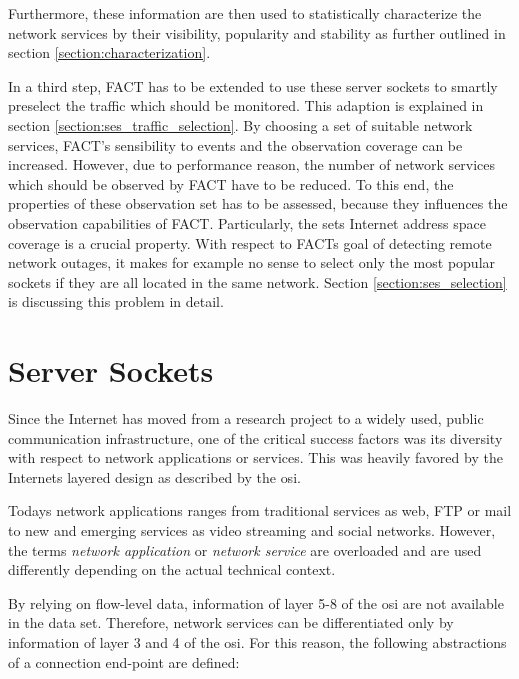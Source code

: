 Furthermore, these information are then used to statistically characterize the network services by their visibility, popularity and stability as further outlined in section \ref{section:characterization}.

In a third step, FACT has to be extended to use these server sockets to smartly preselect the traffic which should be monitored. 
This adaption is explained in section \ref{section:ses_traffic_selection}. 
By choosing a set of suitable network services, \gls{FACT}'s sensibility to events and the observation coverage can be increased. 
However, due to performance reason, the number of network services which should be observed by \gls{FACT} have to be reduced. 
To this end, the properties of these observation set has to be assessed, because they influences the observation capabilities of \gls{FACT}. 
Particularly, the sets Internet address space coverage is a crucial property. 
With respect to FACTs goal of detecting remote network outages, it makes for example no sense to select only the most popular sockets if they are all located in the same network. 
Section \ref{section:ses_selection} is discussing this problem in detail. 

\section{Server Sockets}
Since the Internet has moved from a research project to a widely used, public communication infrastructure, one of the critical success factors was its diversity with respect to network applications or services. This was heavily favored by the Internets layered design as described by the \gls{osi}.

Todays network applications ranges from traditional services as web, \gls{FTP} or mail to new and emerging services as video streaming and social networks. However, the terms \emph{network application} or \emph{network service} are overloaded and are used differently depending on the actual technical context.

By relying on flow-level data, information of layer 5-8 of the \gls{osi} are not available in the data set. Therefore, network services can be differentiated only by information of layer 3 and 4 of the \gls{osi}. For this reason, the following abstractions of a connection end-point are defined:


